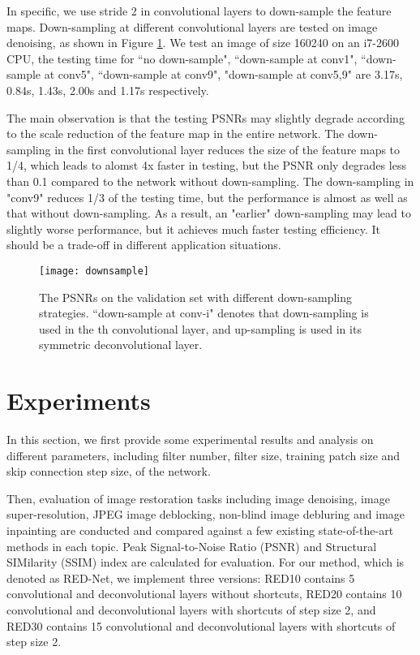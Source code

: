 \documentclass[10pt,journal,compsoc]{IEEEtran}
\begin{document}
In specific, we use stride  2 in convolutional layers to down-sample the feature maps.
Down-sampling at different convolutional layers are tested on image denoising, as shown
in Figure \ref{fig16}. We test an image of size 160240 on an i7-2600 CPU, the testing
time for ``no down-sample", ``down-sample at conv1", ``down-sample at conv5",
``down-sample at conv9", "down-sample at conv5,9" are 3.17s, 0.84s, 1.43s, 2.00s and
1.17s respectively.

The main observation is that the testing PSNRs may slightly degrade according to the scale
reduction of the feature map in the entire network. The down-sampling in the first
convolutional layer reduces the size of the feature maps to 1/4, which leads to alomst 4x
faster in testing, but the PSNR only degrades less than 0.1 compared to the network without
down-sampling. The down-sampling in "conv9" reduces 1/3 of the testing time, but the
performance is almost as well as that without down-sampling. As a result, an "earlier"
down-sampling may lead to slightly worse performance, but it achieves much faster testing
efficiency. It should be a trade-off in different application situations.


\begin{figure}[t!]
\centering
\texttt{[image: downsample]}
\caption{The PSNRs on the validation set with different down-sampling strategies.
``down-sample at conv-i" denotes that down-sampling is used in the th convolutional
layer, and up-sampling is used in its symmetric deconvolutional layer.}
\label{fig16}
\end{figure}

 \section{Experiments}
\label{sec:exp}


In this section, we first provide some experimental results and analysis
on different parameters, including filter number, filter size, training patch
size and skip connection step size, of the network.

Then, evaluation of image
restoration tasks including image denoising, image super-resolution, JPEG image
deblocking, non-blind image debluring and image inpainting are conducted and
compared against a few existing state-of-the-art methods in each topic.
Peak Signal-to-Noise Ratio (PSNR) and Structural SIMilarity (SSIM) index are
calculated for evaluation. For our method, which is denoted as RED-Net,
we implement three versions: RED10 contains 5 convolutional and deconvolutional
layers without shortcuts, RED20 contains 10 convolutional and deconvolutional
layers with shortcuts of step size 2, and RED30 contains 15 convolutional
and deconvolutional layers with shortcuts of step size 2.
\end{document}
